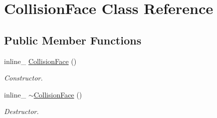 \hypertarget{class_collision_face}{\section{Collision\+Face Class Reference}
\label{class_collision_face}
}
\subsection*{Public Member Functions}
\begin{DoxyCompactItemize}
\item 
\hypertarget{class_collision_face_a7c41bd768a480b02f5dd5c4969472db4}{inline\+\_\+ \hyperlink{class_collision_face_a7c41bd768a480b02f5dd5c4969472db4}{Collision\+Face} ()}\label{class_collision_face_a7c41bd768a480b02f5dd5c4969472db4}

\begin{DoxyCompactList}\small\item\em Constructor. \end{DoxyCompactList}\item 
\hypertarget{class_collision_face_a1282cad4af455c6af279a59e523c27f8}{inline\+\_\+ \hyperlink{class_collision_face_a1282cad4af455c6af279a59e523c27f8}{$\sim$\+Collision\+Face} ()}\label{class_collision_face_a1282cad4af455c6af279a59e523c27f8}

\begin{DoxyCompactList}\small\item\em Destructor. \end{DoxyCompactList}\end{DoxyCompactItemize}
